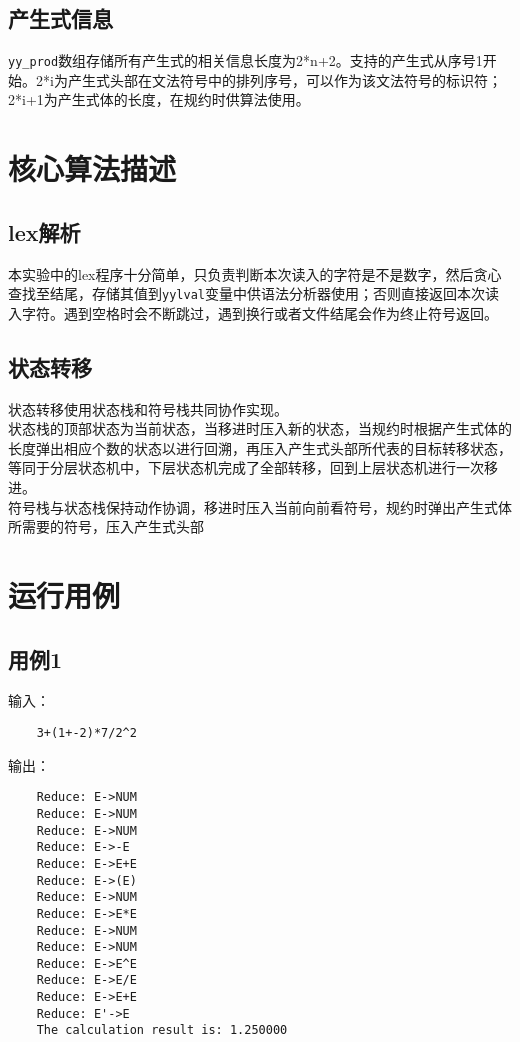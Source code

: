 \documentclass[a4paper]{ctexart} %
\begin{document}
	\subsection{产生式信息}
	\verb|yy_prod|数组存储所有产生式的相关信息长度为2*n+2。支持的产生式从序号1开始。2*i为产生式头部在文法符号中的排列序号，可以作为该文法符号的标识符；2*i+1为产生式体的长度，在规约时供算法使用。

	\section{核心算法描述}
	\subsection{lex解析}
	本实验中的lex程序十分简单，只负责判断本次读入的字符是不是数字，然后贪心查找至结尾，存储其值到\verb|yylval|变量中供语法分析器使用；否则直接返回本次读入字符。遇到空格时会不断跳过，遇到换行或者文件结尾会作为终止符号返回。
	\subsection{状态转移}
	状态转移使用状态栈和符号栈共同协作实现。\\
	状态栈的顶部状态为当前状态，当移进时压入新的状态，当规约时根据产生式体的长度弹出相应个数的状态以进行回溯，再压入产生式头部所代表的目标转移状态，等同于分层状态机中，下层状态机完成了全部转移，回到上层状态机进行一次移进。\\
	符号栈与状态栈保持动作协调，移进时压入当前向前看符号，规约时弹出产生式体所需要的符号，压入产生式头部

	\section{运行用例}

	\subsection{用例1}

	输入：
	\begin{verbatim}
	3+(1+-2)*7/2^2
	\end{verbatim}

	输出：
	\begin{verbatim}
	Reduce: E->NUM
	Reduce: E->NUM
	Reduce: E->NUM
	Reduce: E->-E
	Reduce: E->E+E
	Reduce: E->(E)
	Reduce: E->NUM
	Reduce: E->E*E
	Reduce: E->NUM
	Reduce: E->NUM
	Reduce: E->E^E
	Reduce: E->E/E
	Reduce: E->E+E
	Reduce: E'->E
	The calculation result is: 1.250000
	\end{verbatim}
\end{document}
